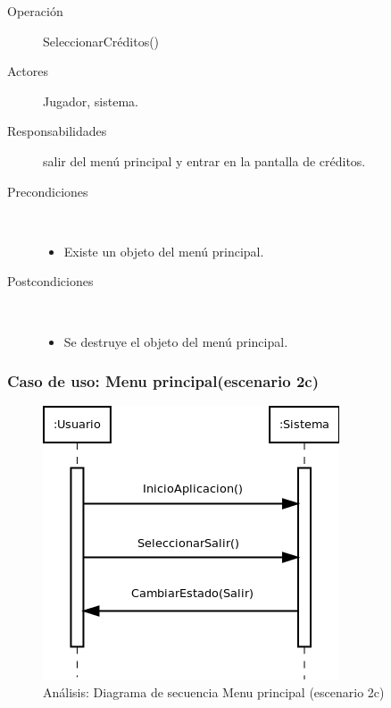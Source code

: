 \begin{description}
    \item [Operación] SeleccionarCréditos()
    \item [Actores] Jugador, sistema.
    \item [Responsabilidades] salir del menú principal y entrar en la pantalla de créditos.
    \item [Precondiciones] $\quad$
        \begin{itemize}
            \item Existe un objeto del menú principal.
        \end{itemize}
    \item [Postcondiciones] $\quad$
        \begin{itemize}
            \item Se destruye el objeto del menú principal.
        \end{itemize}
\end{description}

\subsubsection{Caso de uso: Menu principal(escenario 2c)}

\begin{figure}[H] 
  \label{secuencia_menu_principal4}
  \begin{center}
    \includegraphics[scale=0.6]{imagenes/analisis/secuencia_menu_principal4.png}
  \end{center}
  \caption{Análisis: Diagrama de secuencia Menu principal (escenario 2c)}
\end{figure}

